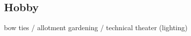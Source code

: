 \documentclass[margin]{res}
\begin{document}
\begin{sloppypar}
\begin{resume}
\section{Hobby}
bow ties / allotment gardening / technical theater (lighting)


%

\end{resume} 
\end{sloppypar}
\end{document}
